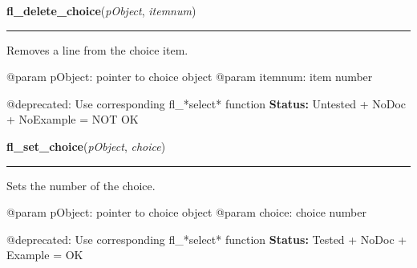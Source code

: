     \label{xformslib:deprecated:fl_delete_choice}

    \vspace{0.5ex}

\hspace{.8\funcindent}\begin{boxedminipage}{\funcwidth}

    \raggedright \textbf{fl\_delete\_choice}(\textit{pObject}, \textit{itemnum})

    \vspace{-1.5ex}

    \rule{\textwidth}{0.5\fboxrule}
\setlength{\parskip}{2ex}

Removes a line from the choice item.

@param pObject: pointer to choice object
@param itemnum: item number

@deprecated: Use corresponding fl\_*select* function
\setlength{\parskip}{1ex}
\textbf{Status:} 
Untested + NoDoc + NoExample = NOT OK


    \end{boxedminipage}

    \label{xformslib:deprecated:fl_set_choice}

    \vspace{0.5ex}

\hspace{.8\funcindent}\begin{boxedminipage}{\funcwidth}

    \raggedright \textbf{fl\_set\_choice}(\textit{pObject}, \textit{choice})

    \vspace{-1.5ex}

    \rule{\textwidth}{0.5\fboxrule}
\setlength{\parskip}{2ex}

Sets the number of the choice.

@param pObject: pointer to choice object
@param choice: choice number

@deprecated: Use corresponding fl\_*select* function
\setlength{\parskip}{1ex}
\textbf{Status:} 
Tested + NoDoc + Example = OK


    \end{boxedminipage}

    \label{xformslib:deprecated:fl_set_choice_text}

